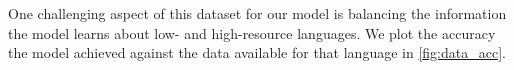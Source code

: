 \documentclass[11pt,a4paper]{article}
\begin{document}


One challenging aspect of this dataset for our model is balancing the
information the model learns about low- and high-resource
languages. We plot the accuracy the model achieved against the data
available for that language in \cref{fig:data_acc}.
\end{document}

